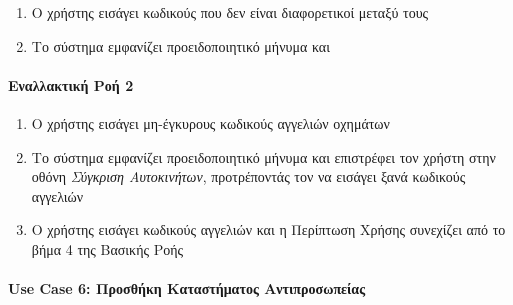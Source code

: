 \documentclass{../ol-softwaremanual}
\begin{document}
	\begin{enumerate}
		\item Ο χρήστης εισάγει κωδικούς που δεν είναι διαφορετικοί μεταξύ τους
		\item Το σύστημα εμφανίζει προειδοποιητικό μήνυμα και 
	\end{enumerate}
	
	\paragraph{Εναλλακτική Ροή 2}
	\begin{enumerate}
		\item Ο χρήστης εισάγει μη-έγκυρους κωδικούς αγγελιών οχημάτων
		\item Το σύστημα εμφανίζει προειδοποιητικό μήνυμα και επιστρέφει τον χρήστη στην οθόνη \textit{Σύγκριση Αυτοκινήτων}, προτρέποντάς τον να εισάγει ξανά κωδικούς αγγελιών
		\item Ο χρήστης εισάγει κωδικούς αγγελιών και η Περίπτωση Χρήσης συνεχίζει από το βήμα 4 της Βασικής Ροής		
	\end{enumerate}
	
	
	\paragraph{\en Use Case 6: \gr Προσθήκη Καταστήματος Αντιπροσωπείας}
	
\end{document}
